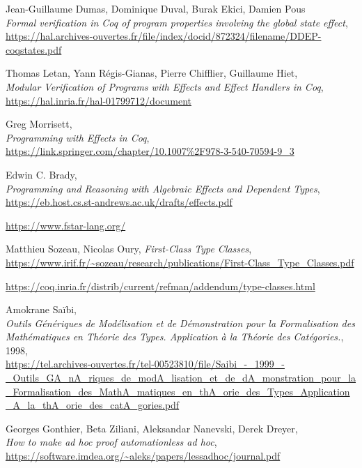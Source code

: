 \documentclass[declaration,inz,english,shortabstract]{iithesis}
\begin{document}
\begin{thebibliography}{1}
        Jean-Guillaume Dumas, Dominique Duval, Burak Ekici, Damien Pous \\
        \textit{Formal verification in Coq of program properties involving the global state effect}, \\
        \url{https://hal.archives-ouvertes.fr/file/index/docid/872324/filename/DDEP-coqstates.pdf}

        Thomas Letan, Yann Régis-Gianas, Pierre Chifflier, Guillaume Hiet, \\
        \textit{Modular Verification of Programs with Effects and Effect Handlers in Coq}, \\
        \url{https://hal.inria.fr/hal-01799712/document}

        Greg Morrisett, \\
        \textit{Programming with Effects in Coq}, \\
        \url{https://link.springer.com/chapter/10.1007%2F978-3-540-70594-9_3}

        Edwin C. Brady, \\
        \textit{Programming and Reasoning with Algebraic Effects and Dependent Types}, \\
        \url{https://eb.host.cs.st-andrews.ac.uk/drafts/effects.pdf}

        \url{https://www.fstar-lang.org/}
    
        Matthieu Sozeau, Nicolas Oury,
        \textit{First-Class Type Classes}, \\
        \url{https://www.irif.fr/~sozeau/research/publications/First-Class_Type_Classes.pdf}

        \url{https://coq.inria.fr/distrib/current/refman/addendum/type-classes.html}

        Amokrane Saïbi, \\
        \textit{Outils Génériques de Modélisation et de Démonstration pour la Formalisation des Mathématiques en Théorie des Types. Application à la Théorie des Catégories.}, 1998, \\
        \url{https://tel.archives-ouvertes.fr/tel-00523810/file/Saibi_-_1999_-_Outils_GA_nA_riques_de_modA_lisation_et_de_dA_monstration_pour_la_Formalisation_des_MathA_matiques_en_thA_orie_des_Types_Application_A_la_thA_orie_des_catA_gories.pdf}

        Georges Gonthier, Beta Ziliani, Aleksandar Nanevski, Derek Dreyer, \\
        \textit{How to make ad hoc proof automationless ad hoc}, \\
        \url{https://software.imdea.org/~aleks/papers/lessadhoc/journal.pdf}


\end{thebibliography}
\end{document}

